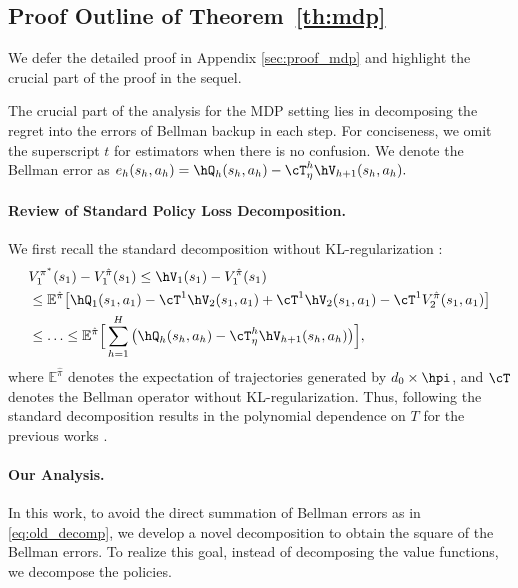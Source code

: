 \documentclass[11pt]{article}
\newcommand{\E}{\mathbb E}
\begin{document}
\subsection{Proof Outline of Theorem~\ref{th:mdp}}
We defer the detailed proof in Appendix \ref{sec:proof_mdp} and highlight the crucial part of the proof in the sequel.

The crucial part of the analysis for the MDP setting lies in decomposing the regret into the errors of Bellman backup in each step. For conciseness, we omit the superscript $t$ for estimators when there is no confusion. We denote the Bellman error as
$
e_h(s_h,a_h) = \hQ_h(s_h,a_h)-\cT_\eta^h \hV_{h+1}(s_h,a_h).
$

\paragraph{Review of Standard Policy Loss Decomposition.}
We first recall the standard decomposition without KL-regularization \citep{zhang2023mathematical}:
\begin{equation}
\begin{aligned}
    &V_1^{\pi^*}(s_1) - V_1^{\hat\pi}(s_1) \le \hV_1(s_1) - V_1^{\hat\pi}(s_1)\\
    &\le \E^{\hat\pi}\big[\hQ_1(s_1,a_1) - \cT^1 \hV_2(s_1,a_1) + \cT^1 \hV_2(s_1,a_1) - \cT^1 V_2^{\hat\pi}(s_1,a_1)\big]\\
    &\le \ldots \le \E^{\hat\pi}\Big[\sum_{h=1}^H \big(\hQ_h(s_h,a_h)-\cT_\eta^h \hV_{h+1}(s_h,a_h)\big) \Big],\label{eq:old_decomp}
\end{aligned}
\end{equation}
where $\E^{\hat\pi}$ denotes the expectation of trajectories generated by $d_0\times\hpi$, and $\cT$ denotes the Bellman operator without KL-regularization. Thus, following the standard decomposition results in the polynomial dependence on $T$ for the previous works \citep{xiong2024iterative,xie2024exploratory}.

\paragraph{Our Analysis.}
In this work, to avoid the direct summation of Bellman errors as in \eqref{eq:old_decomp}, we develop a novel decomposition to obtain the square of the Bellman errors. To realize this goal, instead of decomposing the value functions, we decompose the policies.
\end{document}
